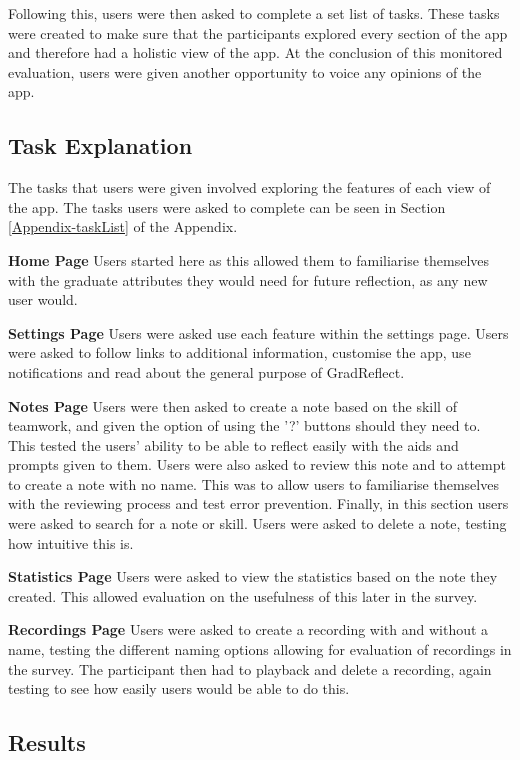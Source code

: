 \documentclass{l4proj}
\begin{document}
Following this, users were then asked to complete a set list of tasks. These tasks were created to make sure that the participants explored every section of the app and therefore had a holistic view of the app. At the conclusion of this monitored evaluation, users were given another opportunity to voice any opinions of the app.


\subsection{Task Explanation}

The tasks that users were given involved exploring the features of each view of the app. The tasks users were asked to complete can be seen in Section \ref{Appendix-taskList} of the Appendix.

\textbf{Home Page} Users started here as this allowed them to familiarise themselves with the graduate attributes they would need for future reflection, as any new user would. 
 
\textbf{Settings Page} Users were asked use each feature within the settings page. Users were asked to follow links to additional information, customise the app, use notifications and read about the general purpose of GradReflect.

\textbf{Notes Page} Users were then asked to create a note based on the skill of teamwork, and given the option of using the '?' buttons should they need to. This tested the users’ ability to be able to reflect easily with the aids and prompts given to them. Users were also asked to review this note and to attempt to create a note with no name. This was to allow users to familiarise themselves with the reviewing process and test error prevention. Finally, in this section users were asked to search for a note or skill. Users were asked to delete a note, testing how intuitive this is.
 
\textbf{Statistics Page} Users were asked to view the statistics based on the note they created. This allowed evaluation on the usefulness of this later in the survey. 

\textbf{Recordings Page} Users were asked to create a recording with and without a name, testing the different naming options allowing for evaluation of recordings in the survey. The participant then had to playback and delete a recording, again testing to see how easily users would be able to do this.

\subsection{Results}
\end{document}
